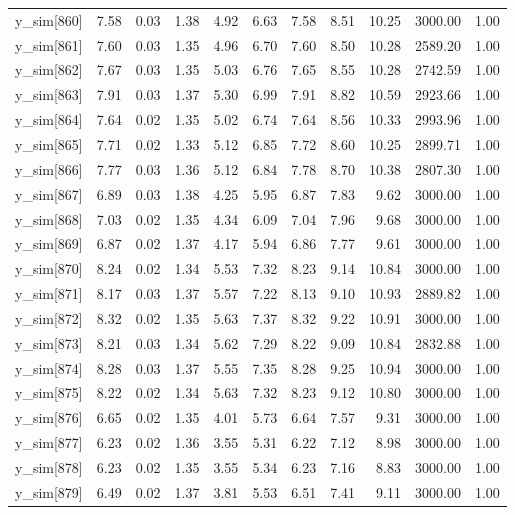 \begin{table}[ht]
\begin{tabular}{rrrrrrrrrrr}
  y\_sim[860] & 7.58 & 0.03 & 1.38 & 4.92 & 6.63 & 7.58 & 8.51 & 10.25 & 3000.00 & 1.00 \\ 
  y\_sim[861] & 7.60 & 0.03 & 1.35 & 4.96 & 6.70 & 7.60 & 8.50 & 10.28 & 2589.20 & 1.00 \\ 
  y\_sim[862] & 7.67 & 0.03 & 1.35 & 5.03 & 6.76 & 7.65 & 8.55 & 10.28 & 2742.59 & 1.00 \\ 
  y\_sim[863] & 7.91 & 0.03 & 1.37 & 5.30 & 6.99 & 7.91 & 8.82 & 10.59 & 2923.66 & 1.00 \\ 
  y\_sim[864] & 7.64 & 0.02 & 1.35 & 5.02 & 6.74 & 7.64 & 8.56 & 10.33 & 2993.96 & 1.00 \\ 
  y\_sim[865] & 7.71 & 0.02 & 1.33 & 5.12 & 6.85 & 7.72 & 8.60 & 10.25 & 2899.71 & 1.00 \\ 
  y\_sim[866] & 7.77 & 0.03 & 1.36 & 5.12 & 6.84 & 7.78 & 8.70 & 10.38 & 2807.30 & 1.00 \\ 
  y\_sim[867] & 6.89 & 0.03 & 1.38 & 4.25 & 5.95 & 6.87 & 7.83 & 9.62 & 3000.00 & 1.00 \\ 
  y\_sim[868] & 7.03 & 0.02 & 1.35 & 4.34 & 6.09 & 7.04 & 7.96 & 9.68 & 3000.00 & 1.00 \\ 
  y\_sim[869] & 6.87 & 0.02 & 1.37 & 4.17 & 5.94 & 6.86 & 7.77 & 9.61 & 3000.00 & 1.00 \\ 
  y\_sim[870] & 8.24 & 0.02 & 1.34 & 5.53 & 7.32 & 8.23 & 9.14 & 10.84 & 3000.00 & 1.00 \\ 
  y\_sim[871] & 8.17 & 0.03 & 1.37 & 5.57 & 7.22 & 8.13 & 9.10 & 10.93 & 2889.82 & 1.00 \\ 
  y\_sim[872] & 8.32 & 0.02 & 1.35 & 5.63 & 7.37 & 8.32 & 9.22 & 10.91 & 3000.00 & 1.00 \\ 
  y\_sim[873] & 8.21 & 0.03 & 1.34 & 5.62 & 7.29 & 8.22 & 9.09 & 10.84 & 2832.88 & 1.00 \\ 
  y\_sim[874] & 8.28 & 0.03 & 1.37 & 5.55 & 7.35 & 8.28 & 9.25 & 10.94 & 3000.00 & 1.00 \\ 
  y\_sim[875] & 8.22 & 0.02 & 1.34 & 5.63 & 7.32 & 8.23 & 9.12 & 10.80 & 3000.00 & 1.00 \\ 
  y\_sim[876] & 6.65 & 0.02 & 1.35 & 4.01 & 5.73 & 6.64 & 7.57 & 9.31 & 3000.00 & 1.00 \\ 
  y\_sim[877] & 6.23 & 0.02 & 1.36 & 3.55 & 5.31 & 6.22 & 7.12 & 8.98 & 3000.00 & 1.00 \\ 
  y\_sim[878] & 6.23 & 0.02 & 1.35 & 3.55 & 5.34 & 6.23 & 7.16 & 8.83 & 3000.00 & 1.00 \\ 
  y\_sim[879] & 6.49 & 0.02 & 1.37 & 3.81 & 5.53 & 6.51 & 7.41 & 9.11 & 3000.00 & 1.00 \\ 

\end{tabular}
\end{table}
